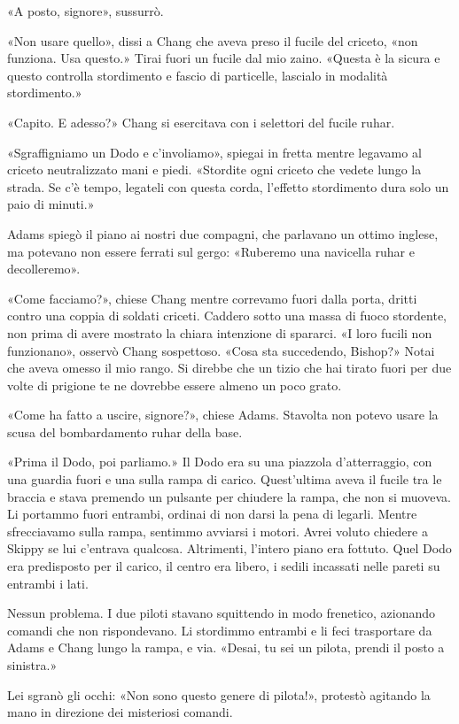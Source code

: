 «A posto, signore», sussurrò.

«Non usare quello», dissi a Chang che aveva preso il fucile del criceto,
«non funziona. Usa questo.» Tirai fuori un fucile dal mio zaino. «Questa
è la sicura e questo controlla stordimento e fascio di particelle,
lascialo in modalità stordimento.»

«Capito. E adesso?» Chang si esercitava con i selettori del fucile
ruhar.

«Sgraffigniamo un Dodo e c'involiamo», spiegai in fretta mentre legavamo
al criceto neutralizzato mani e piedi. «Stordite ogni criceto che vedete
lungo la strada. Se c'è tempo, legateli con questa corda, l'effetto
stordimento dura solo un paio di minuti.»

Adams spiegò il piano ai nostri due compagni, che parlavano un ottimo
inglese, ma potevano non essere ferrati sul gergo: «Ruberemo una
navicella ruhar e decolleremo».

«Come facciamo?», chiese Chang mentre correvamo fuori dalla porta,
dritti contro una coppia di soldati criceti. Caddero sotto una massa di
fuoco stordente, non prima di avere mostrato la chiara intenzione di
spararci. «I loro fucili non funzionano», osservò Chang sospettoso.
«Cosa sta succedendo, Bishop?» Notai che aveva omesso il mio rango. Si
direbbe che un tizio che hai tirato fuori per due volte di prigione te
ne dovrebbe essere almeno un poco grato.

«Come ha fatto a uscire, signore?», chiese Adams. Stavolta non potevo
usare la scusa del bombardamento ruhar della base.

«Prima il Dodo, poi parliamo.» Il Dodo era su una piazzola
d'atterraggio, con una guardia fuori e una sulla rampa di carico.
Quest'ultima aveva il fucile tra le braccia e stava premendo un pulsante
per chiudere la rampa, che non si muoveva. Li portammo fuori entrambi,
ordinai di non darsi la pena di legarli. Mentre sfrecciavamo sulla
rampa, sentimmo avviarsi i motori. Avrei voluto chiedere a Skippy se lui
c'entrava qualcosa. Altrimenti, l'intero piano era fottuto. Quel Dodo
era predisposto per il carico, il centro era libero, i sedili incassati
nelle pareti su entrambi i lati.

Nessun problema. I due piloti stavano squittendo in modo frenetico,
azionando comandi che non rispondevano. Li stordimmo entrambi e li feci
trasportare da Adams e Chang lungo la rampa, e via. «Desai, tu sei un
pilota, prendi il posto a sinistra.»

Lei sgranò gli occhi: «Non sono questo genere di pilota!», protestò
agitando la mano in direzione dei misteriosi comandi.

